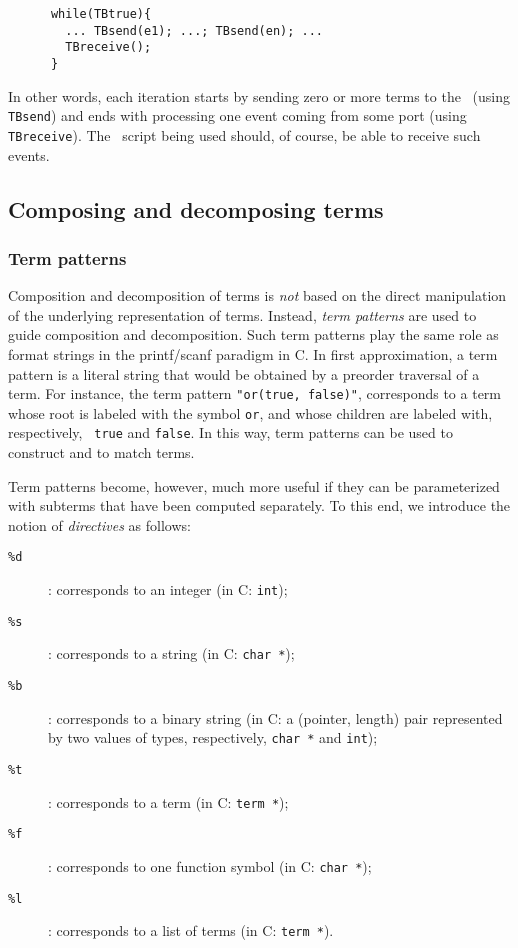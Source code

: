\begin{verbatim}
      while(TBtrue){
        ... TBsend(e1); ...; TBsend(en); ...
        TBreceive();
      }
\end{verbatim}

In other words, each iteration starts by sending zero or more terms
to the \TB\ (using {\tt TBsend}) and ends with processing one event
coming from some port (using {\tt TBreceive}).  The \T\ script being used
should, of course, be able to receive such events.


\subsection{\label{Compose}Composing and decomposing terms}

\subsubsection{\label{Patterns}Term patterns}
Composition and decomposition of terms is {\em not} based on the
direct manipulation of the underlying representation of terms.
Instead, {\em term patterns} are used to guide composition and
decomposition.  Such term patterns play the same role as format
strings in the printf/scanf paradigm in C.  In first approximation, a
term pattern is a literal string that would be obtained by a preorder
traversal of a term.  For instance, the term pattern {\tt "or(true,
false)"}, corresponds to a term whose root is labeled with the symbol
{\tt or}, and whose children are labeled with, respectively, {\tt
true} and {\tt false}. In this way, term patterns can be used to
construct and to match terms.

Term patterns become, however, much more useful if they can be parameterized
with subterms that have been computed separately.
To this end, we introduce the notion of {\em directives} as follows:

\begin{description}
\item[{\tt \%d}]: corresponds to an integer (in C: {\tt int});
\item[{\tt \%s}]: corresponds to a string (in C: {\tt char *});
\item[{\tt \%b}]: corresponds to a binary string (in C: a (pointer, length) pair 
represented by two values of types, respectively, {\tt char *} and {\tt int});
\item[{\tt \%t}]: corresponds to a term (in C: {\tt term *});
\item[{\tt \%f}]: corresponds to one function symbol (in C: {\tt char *});
\item[{\tt \%l}]: corresponds to a list of terms (in C: {\tt term *}).
\end{description}


